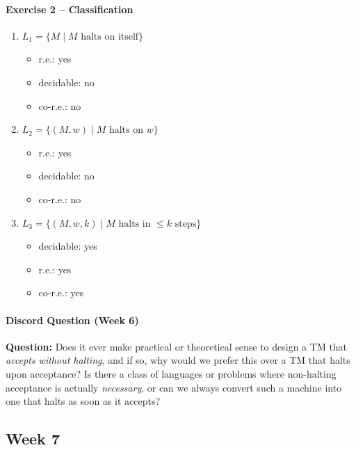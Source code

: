 \documentclass[11pt, a4paper]{article}
\theoremstyle{definition}
\theoremstyle{remark}
\begin{document}
\paragraph{Exercise 2 -- Classification}

\begin{enumerate}
    \item $L_1 = \{M \mid M \text{ halts on itself}\}$

    \begin{itemize}
        \item r.e.: yes
        \item decidable: no
        \item co-r.e.: no
    \end{itemize}

    \item $L_2 = \{(M,w) \mid M \text{ halts on } w\}$

    \begin{itemize}
        \item r.e.: yes
        \item decidable: no
        \item co-r.e.: no
    \end{itemize}

    \item $L_3 = \{(M,w,k) \mid M \text{ halts in } \le k \text{ steps}\}$

    \begin{itemize}
        \item decidable: yes
        \item r.e.: yes
        \item co-r.e.: yes
    \end{itemize}
\end{enumerate}

\paragraph{Discord Question (Week 6)}

\textbf{Question:} Does it ever make practical or theoretical sense to design a TM that
\emph{accepts without halting}, and if so, why would we prefer this over a TM that halts upon acceptance?
Is there a class of languages or problems where non-halting acceptance is actually \emph{necessary},
or can we always convert such a machine into one that halts as soon as it accepts?

\subsection{Week 7}
\end{document}
